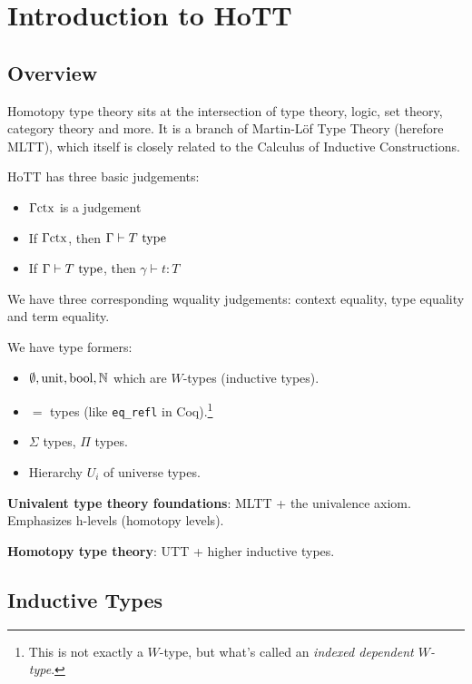 \section{Introduction to HoTT}

\subsection{Overview}
Homotopy type theory sits at the intersection of type theory, logic, set theory,
category theory and more. It is a branch of Martin-L\"of Type Theory (herefore MLTT),
which itself is closely related to the Calculus of Inductive Constructions.

HoTT has three basic judgements:
\begin{itemize}
\item $\Gamma \mathrm{ctx}$ is a judgement
\item If $\Gamma \mathrm{ctx}$, then $\Gamma \vdash T ~\mathrm{type}$
\item If $\Gamma \vdash T ~\mathrm{type}$, then $\gamma \vdash t : T$
\end{itemize}

We have three corresponding wquality judgements: context equality, type
equality and term equality.

We have type formers: 
\begin{itemize}
\item $\emptyset, \mathrm{unit}, \mathrm{bool}, \mathbb{N}$ which are $W$-types (inductive types).
\item $=$ types (like \lstinline{eq_refl} in Coq).\footnote{This is not exactly a $W$-type, but what's called an \emph{indexed dependent $W$-type}.}
\item $\Sigma$ types, $\Pi$ types.
\item Hierarchy $U_i$ of universe types.
\end{itemize}

\textbf{Univalent type theory foundations}: MLTT + the univalence axiom. Emphasizes h-levels (homotopy levels).

\textbf{Homotopy type theory}: UTT + higher inductive types.

\subsection{Inductive Types}

